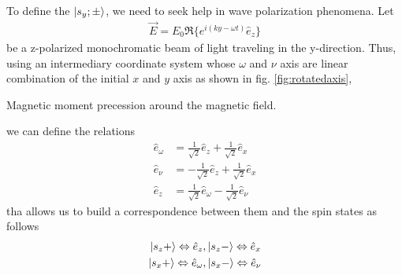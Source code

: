 \documentclass{article}
\begin{document}
To define the $\lvert s_y;\pm\rangle$, we need to seek help in wave polarization phenomena. Let
\begin{align}\label{eq:monochromaticbeam}
  \vec{E}=E_0\Re\{e^{i(ky-\omega t)}\hat{e}_z\}
\end{align}
be a z-polarized monochromatic beam of light traveling in the y-direction. Thus, using an intermediary coordinate system whose $\omega$ and $\nu$ axis are linear combination of the initial $x$ and $y$ axis as shown in fig. \ref{fig:rotatedaxis},
\begin{marginfigure}%
  \begin{centering}
    \caption{Magnetic moment precession around the magnetic field.}\label{fig:rotatedaxis}
  \end{centering}
\end{marginfigure}
we can define the relations
\begin{align}\label{eq:axisrelations}
  \hat{e}_\omega &= \frac{1}{\sqrt{2}}\hat{e}_z + \frac{1}{\sqrt{2}}\hat{e}_x\\
  \hat{e}_\nu &= -\frac{1}{\sqrt{2}}\hat{e}_z + \frac{1}{\sqrt{2}}\hat{e}_x\\
  \hat{e}_z &= \frac{1}{\sqrt{2}}\hat{e}_\omega - \frac{1}{\sqrt{2}}\hat{e}_{\nu}
\end{align}
tha allows us to build a correspondence between them and the spin states as follows
\begin{align}\label{eq:axiscorrespond}
  \lvert s_z+\rangle \Leftrightarrow \hat{e}_{z}, \,& \lvert s_z-\rangle \Leftrightarrow \hat{e} _{x}\\
  \lvert s_x+\rangle \Leftrightarrow \hat{e}_{\omega}, \,& \lvert s_x-\rangle \Leftrightarrow \hat{e} _{\nu}
\end{align}
\end{document}
